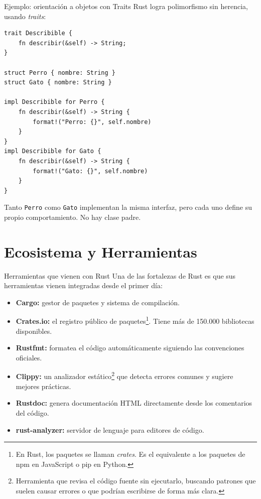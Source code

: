 \documentclass[11pt, aspectratio=169]{beamer}
\begin{document}
	\begin{frame}[fragile]{Ejemplo: orientación a objetos con Traits}
		Rust logra polimorfismo sin herencia, usando \textit{traits}:
		\begin{lstlisting}[style=rust]
trait Describible {
    fn describir(&self) -> String;
}

struct Perro { nombre: String }
struct Gato { nombre: String }

impl Describible for Perro {
    fn describir(&self) -> String {
        format!("Perro: {}", self.nombre)
    }
}
impl Describible for Gato {
    fn describir(&self) -> String {
        format!("Gato: {}", self.nombre)
    }
}
		\end{lstlisting}
		Tanto \texttt{Perro} como \texttt{Gato} implementan la misma interfaz, pero cada uno define su propio comportamiento. No hay clase padre.
	\end{frame}

	\section{Ecosistema y Herramientas}

	\begin{frame}{Herramientas que vienen con Rust}
		Una de las fortalezas de Rust es que sus herramientas vienen integradas desde el primer día:
		\vspace{0.2cm}
		\begin{itemize}
			\item \textbf{Cargo:} gestor de paquetes y sistema de compilación.
			\item \textbf{Crates.io:} el registro público de paquetes\footnote{En Rust, los paquetes se llaman \textit{crates}. Es el equivalente a los paquetes de npm en JavaScript o pip en Python.}. Tiene más de 150.000 bibliotecas disponibles.
			\item \textbf{Rustfmt:} formatea el código automáticamente siguiendo las convenciones oficiales.
			\item \textbf{Clippy:} un analizador estático\footnote{Herramienta que revisa el código fuente sin ejecutarlo, buscando patrones que suelen causar errores o que podrían escribirse de forma más clara.} que detecta errores comunes y sugiere mejores prácticas.
			\item \textbf{Rustdoc:} genera documentación HTML directamente desde los comentarios del código.
			\item \textbf{rust-analyzer:} servidor de lenguaje para editores de código.
		\end{itemize}
	\end{frame}
\end{document}

